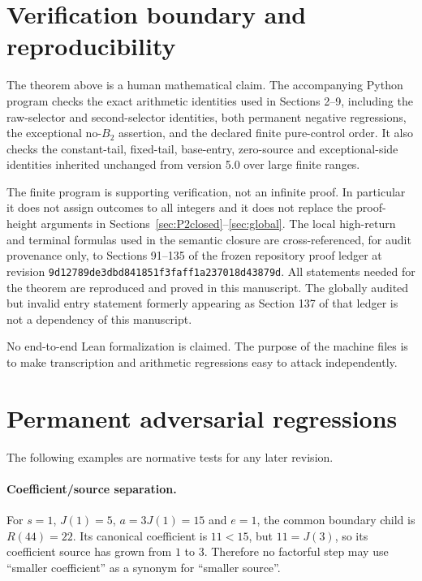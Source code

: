 \section{Verification boundary and reproducibility}\label{sec:verification}

The theorem above is a human mathematical claim.  The accompanying Python
program checks the exact arithmetic identities used in Sections 2--9,
including the raw-selector and second-selector identities, both permanent
negative regressions, the exceptional no-$B_2$ assertion, and the declared
finite pure-control order.  It also checks the constant-tail, fixed-tail,
base-entry, zero-source and exceptional-side identities inherited unchanged
from version 5.0 over large finite ranges.

The finite program is supporting verification, not an infinite proof.  In
particular it does not assign outcomes to all integers and it does not replace
the proof-height arguments in Sections~\ref{sec:P2closed}--\ref{sec:global}.
The local high-return and terminal formulas used in the semantic closure are
cross-referenced, for audit provenance only, to Sections 91--135 of the frozen
repository proof ledger at revision
\nolinkurl{9d12789de3dbd841851f3faff1a237018d43879d}.  All statements needed for
the theorem are reproduced and proved in this manuscript.  The globally
audited but invalid entry statement formerly appearing as Section 137 of that
ledger is not a dependency of this manuscript.

No end-to-end Lean formalization is claimed.  The purpose of the machine files
is to make transcription and arithmetic regressions easy to attack
independently.

\appendix
\section{Permanent adversarial regressions}

The following examples are normative tests for any later revision.

\paragraph{Coefficient/source separation.}
For $s=1$, $J(1)=5$, $a=3J(1)=15$ and $e=1$, the common boundary child is
$R(44)=22$.  Its canonical coefficient is $11<15$, but $11=J(3)$, so its
coefficient source has grown from $1$ to $3$.  Therefore no factorful step may
use ``smaller coefficient'' as a synonym for ``smaller source''.


